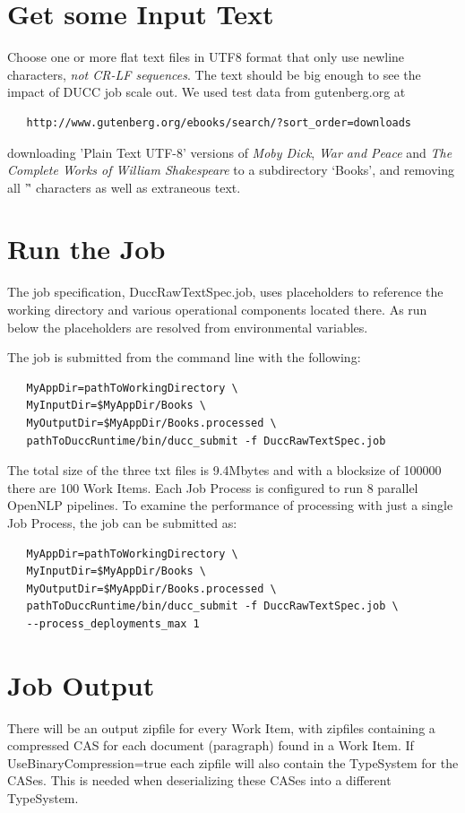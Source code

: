 \section{Get some Input Text}
Choose one or more flat text files in UTF8 format that only use newline characters,
{\em not CR-LF sequences}.
The text should be big enough to see the impact of DUCC job scale out.
We used test data from gutenberg.org at
\begin{verbatim}
   http://www.gutenberg.org/ebooks/search/?sort_order=downloads
\end{verbatim}
downloading 'Plain Text UTF-8' versions of {\em Moby Dick}, {\em War and Peace} and {\em The Complete Works of William Shakespeare} 
to a subdirectory `Books', and removing all '\r' characters as well as extraneous text.

\section{Run the Job}
The job specification, DuccRawTextSpec.job, uses placeholders to reference the working directory
and various operational components located there. As run below the placeholders are resolved
from environmental variables.

The job is submitted from the command line with the following:
\begin{verbatim}
   MyAppDir=pathToWorkingDirectory \
   MyInputDir=$MyAppDir/Books \
   MyOutputDir=$MyAppDir/Books.processed \
   pathToDuccRuntime/bin/ducc_submit -f DuccRawTextSpec.job
\end{verbatim}

The total size of the three txt files is 9.4Mbytes and with a blocksize of 100000 there are 100 Work Items. Each Job Process is 
configured to run 8 parallel OpenNLP pipelines. To examine the performance of processing with just a single Job Process, 
the job can be submitted as:

\begin{verbatim}
   MyAppDir=pathToWorkingDirectory \
   MyInputDir=$MyAppDir/Books \
   MyOutputDir=$MyAppDir/Books.processed \
   pathToDuccRuntime/bin/ducc_submit -f DuccRawTextSpec.job \
   --process_deployments_max 1
\end{verbatim}

\section{Job Output}
There will be an output zipfile for every Work Item, with zipfiles containing a compressed CAS for each document (paragraph) 
found in a Work Item. If UseBinaryCompression=true each zipfile will also contain the TypeSystem for the CASes. 
This is needed when deserializing these CASes into a different TypeSystem.


